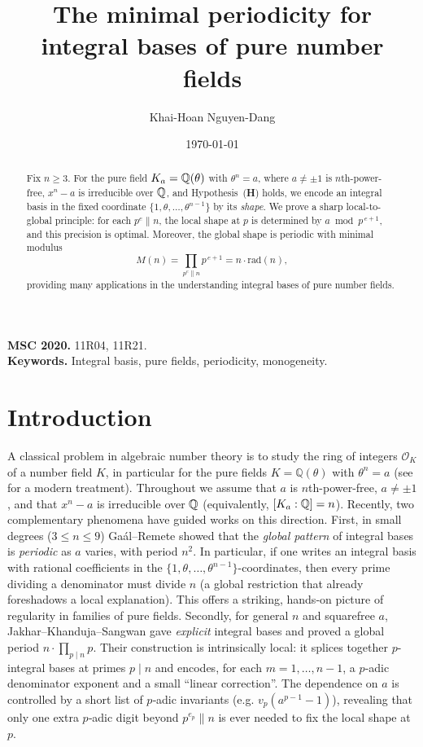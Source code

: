 \documentclass[12pt,a4paper,oneside]{amsart}
\title{The minimal periodicity for integral bases of pure number fields}
\author{Khai-Hoan Nguyen-Dang}
\date{\today}
\theoremstyle{definition}
\begin{document}
\begin{abstract}
Fix $n\ge3$. For the pure field $K_a=\Bbb Q(\theta)$ with $\theta^n=a$, where $a\neq \pm1$ is $n$th-power-free, $x^n-a$ is irreducible over $\Bbb Q$, and Hypothesis~\textup{(\textbf{H})} holds, we encode an integral basis in the fixed coordinate $\{1,\theta,\dots,\theta^{n-1}\}$ by its \emph{shape}. We prove a sharp local-to-global principle: for each $p^e\!\parallel n$, the local shape at $p$ is determined by $a\bmod p^{\,e+1}$, and this precision is optimal. Moreover, the global shape is periodic with minimal modulus
\[
M(n)=\prod_{p^e\parallel n}p^{\,e+1}=n\cdot\mathrm{rad}(n),
\]
providing many applications in the understanding integral bases of pure number fields.
\end{abstract}
\maketitle
\medskip
\noindent\textbf{MSC 2020.} 11R04, 11R21. \\
\textbf{Keywords.} Integral basis, pure fields, periodicity, monogeneity.

\section{Introduction}
A classical problem in algebraic number theory is to study the ring of integers $\mathcal{O}_K$ of a number field $K$, in particular for the pure fields $K=\mathbb{Q}(\theta)$ with $\theta^n=a$ (see \cite{Gaal2019Book} for a modern treatment). Throughout we assume that $a$ is $n$th-power-free, $a\neq\pm1$, and that $x^n-a$ is irreducible over $\Bbb Q$ (equivalently, $[K_a:\Bbb Q]=n$). Recently, two complementary phenomena have guided works on this direction.  First, in small degrees (\(3\le n\le 9\)) Ga\'al--Remete \cite{GR17} showed that the \emph{global pattern} of integral bases is \emph{periodic} as \(a\) varies, with period \(n^2\). In particular, if one writes an integral basis with rational coefficients in the \(\{1,\theta,\dots,\theta^{n-1}\}\)-coordinates, then every prime dividing a denominator must divide \(n\) (a global restriction that already foreshadows a local explanation).  This offers a striking, hands‑on picture of regularity in families of pure fields. Secondly, for general \(n\) and squarefree \(a\), Jakhar--Khanduja--Sangwan \cite{JKS21} gave \emph{explicit} integral bases and proved a global period \(n\cdot\prod_{p\mid n}p\).  Their construction is intrinsically local: it splices together \(p\)-integral bases at primes \(p\mid n\) and encodes, for each \(m=1,\dots,n-1\), a $p$‑adic denominator exponent and a small “linear correction”.  The dependence on \(a\) is controlled by a short list of $p$‑adic invariants (e.g. \(v_p(a^{p-1}-1)\)), revealing that only one extra $p$‑adic digit beyond \(p^{e_p}\parallel n\) is ever needed to fix the local shape at \(p\).  
\end{document}
